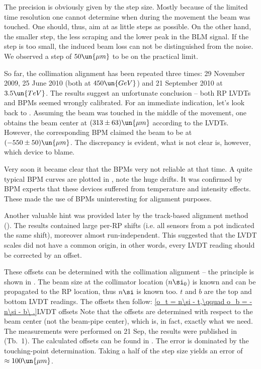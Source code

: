 
The precision is obviously given by the step size. Mostly because of the limited time resolution one cannot determine when during the movement the beam was touched. One should, thus, aim at as little steps as possible. On the other hand, the smaller step, the less scraping and the lower peak in the BLM signal. If the step is too small, the induced beam loss can not be distinguished from the noise. We observed a step of $50\un{\mu m}$ to be on the practical limit.

So far, the collimation alignment has been repeated three times: 29 November 2009, 25 June 2010 (both at $450\un{GeV}$) and 21 September 2010 at $3.5\un{TeV}$. The results suggest an unfortunate conclusion -- both RP LVDTs and BPMs seemed wrongly calibrated. For an immediate indication, let's look back to . Assuming the beam was touched in the middle of the movement, one obtains the beam center at $(313\pm 63)\un{\mu m}$ according to the LVDTs. However, the corresponding BPM claimed the beam to be at $(-550\pm50)\un{\mu m}$. The discrepancy is evident, what is not clear is, however, which device to blame.

Very soon it became clear that the BPMs very not reliable at that time. A quite typical BPM curves are plotted in , note the huge drifts. It was confirmed by BPM experts that these devices suffered from temperature and intensity effects. These made the use of BPMs uninteresting for alignment purposes.


Another valuable hint was provided later by the track-based alignment method (). The results contained large per-RP shifts (i.e. all sensors from a pot indicated the same shift), moreover almost run-independent. This suggested that the LVDT scales did not have a common origin, in other words, every LVDT reading should be corrected by an offset. 

These offsets can be determined with the collimation alignment -- the principle is shown in . The beam size at the collimator location ($n\si_0$) is known and can be propagated to the RP location, thus $n\si$ is known too. $t$ and $b$ are the top and bottom LVDT readings. The offsets then follow:
\eqref{o_t = n\si - t,\qquad o_b = -n\si - b\ .}{LVDT offsets}
Note that the offsets are determined with respect to the beam center (not the beam-pipe center), which is, in fact, exactly what we need. The measurements were performed on 21 Sep, the results were published in  (Tb.~1). The calculated offsets can be found in . The error is dominated by the touching-point determination. Taking a half of the step size yields an error of $\approx 100\un{\mu m}$.

